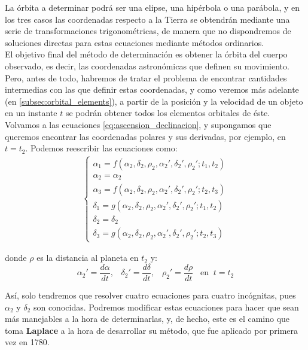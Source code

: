 \documentclass[11pt]{book}
\begin{document}
La órbita a determinar podrá ser una elipse, una hipérbola o una parábola, y en los tres casos las coordenadas respecto a la Tierra se obtendrán mediante una serie de transformaciones trigonométricas, de manera que no dispondremos de soluciones directas para estas ecuaciones mediante métodos ordinarios.\\

El objetivo final del método de determinación es obtener la órbita del cuerpo observado, es decir, las coordenadas astronómicas que definen su movimiento. Pero, antes de todo, habremos de tratar el problema de encontrar cantidades intermedias con las que definir estas coordenadas, y como veremos más adelante (en \ref{subsec:orbital_elements}), a partir de la posición y la velocidad de un objeto en un instante $t$ se podrán obtener todos los elementos orbitales de éste.\\

Volvamos a las ecuaciones \eqref{eq:ascension_declinacion}, y supongamos que queremos encontrar las coordenadas polares y sus derivadas, por ejemplo, en $t=t_2$. Podemos reescribir las ecuaciones como:
\begin{align}
\left\{\begin{array}{l}
	\alpha_1 = f(\alpha_2, \delta_2, \rho_2, \alpha_2', \delta_2', \rho_2'; t_1, t_2)\\ 
	\alpha_2 = \alpha_2\\
	\alpha_3 = f(\alpha_2, \delta_2, \rho_2, \alpha_2', \delta_2', \rho_2'; t_2, t_3)\\
	\delta_1 = g(\alpha_2, \delta_2, \rho_2, \alpha_2', \delta_2', \rho_2'; t_1, t_2)\\
	\delta_2 = \delta_2\\
	\delta_3 = g(\alpha_2, \delta_2, \rho_2, \alpha_2', \delta_2', \rho_2'; t_2, t_3)
\end{array}
\right.
\label{eq:idea_laplace}
\end{align}

\noindent donde $\rho$ es la distancia al planeta en $t_2$ y:
\[
\alpha_2'=\frac{d\alpha}{dt}, \; \; \; \delta_2'=\frac{d\delta}{dt}, \; \; \; \rho_2'=\frac{d\rho}{dt} \; \; \;  \text{en} \; \; t=t_2
\]

Así, solo tendremos que resolver cuatro ecuaciones para cuatro incógnitas, pues $\alpha_2$ y $\delta_2$ son conocidas. Podremos modificar estas ecuaciones para hacer que sean más manejables a la hora de determinarlas, y, de hecho, este es el camino que toma \textbf{Laplace} a la hora de desarrollar su método, que fue aplicado por primera vez en 1780.\\
\end{document}
